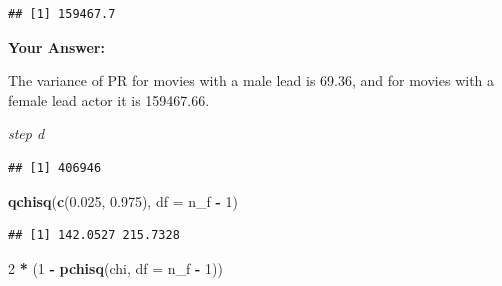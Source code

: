 \documentclass[
]{article}
\newenvironment{Shaded}{\begin{snugshade}}{\end{snugshade}}
\newcommand{\AttributeTok}[1]{\textcolor[rgb]{0.13,0.29,0.53}{#1}}
\newcommand{\ConstantTok}[1]{\textcolor[rgb]{0.56,0.35,0.01}{#1}}
\newcommand{\DecValTok}[1]{\textcolor[rgb]{0.00,0.00,0.81}{#1}}
\newcommand{\FloatTok}[1]{\textcolor[rgb]{0.00,0.00,0.81}{#1}}
\newcommand{\FunctionTok}[1]{\textcolor[rgb]{0.13,0.29,0.53}{\textbf{#1}}}
\newcommand{\NormalTok}[1]{#1}
\newcommand{\OtherTok}[1]{\textcolor[rgb]{0.56,0.35,0.01}{#1}}
\newcommand{\SpecialCharTok}[1]{\textcolor[rgb]{0.81,0.36,0.00}{\textbf{#1}}}
\newcommand{\StringTok}[1]{\textcolor[rgb]{0.31,0.60,0.02}{#1}}
\begin{document}
\begin{verbatim}
## [1] 159467.7
\end{verbatim}

\textbf{Your Answer:}

The variance of PR for movies with a male lead is 69.36, and for movies
with a female lead actor it is 159467.66.

\emph{step d}

\begin{Shaded}
\end{Shaded}

\begin{verbatim}
## [1] 406946
\end{verbatim}

\begin{Shaded}
\begin{Highlighting}[]
\FunctionTok{qchisq}\NormalTok{(}\FunctionTok{c}\NormalTok{(}\FloatTok{0.025}\NormalTok{, }\FloatTok{0.975}\NormalTok{), }\AttributeTok{df =}\NormalTok{ n\_f }\SpecialCharTok{{-}} \DecValTok{1}\NormalTok{)      }
\end{Highlighting}
\end{Shaded}

\begin{verbatim}
## [1] 142.0527 215.7328
\end{verbatim}

\begin{Shaded}
\begin{Highlighting}[]
\DecValTok{2} \SpecialCharTok{*}\NormalTok{ (}\DecValTok{1} \SpecialCharTok{{-}} \FunctionTok{pchisq}\NormalTok{(chi, }\AttributeTok{df =}\NormalTok{ n\_f }\SpecialCharTok{{-}} \DecValTok{1}\NormalTok{)) }
\end{Highlighting}
\end{Shaded}
\end{document}
